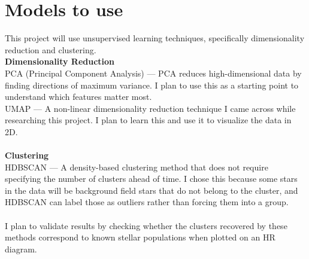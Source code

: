 \documentclass[12pt]{article}
\begin{document}
\section{Models to use}
This project will use unsupervised learning techniques, specifically dimensionality reduction and clustering.\\
\textbf{Dimensionality Reduction}\\
{PCA (Principal Component Analysis)} —  PCA reduces high-dimensional data by finding directions of maximum variance. I plan to use this as a starting point to understand which features matter most.\\
{UMAP} — A non-linear dimensionality reduction technique I came across while researching this project. I plan to learn this and use it to visualize the data in 2D.
\\ \\
\textbf{Clustering}\\
HDBSCAN — A density-based clustering method that does not require specifying the number of clusters ahead of time. I chose this because some stars in the data will be background field stars that do not belong to the cluster, and HDBSCAN can label those as outliers rather than forcing them into a group.
\\ \\
I plan to validate results by checking whether the clusters recovered by these methods correspond to known stellar populations when plotted on an HR diagram.
\end{document}
